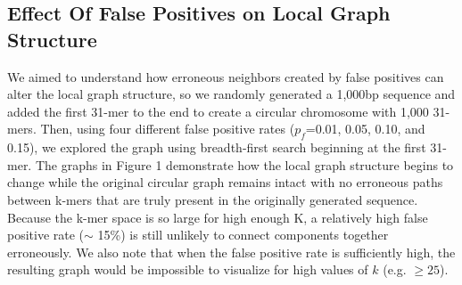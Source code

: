 \documentclass[12pt]{article} \usepackage{simplemargins}
\begin{document}
\subsection{Effect Of False Positives on Local Graph Structure}
We aimed to understand how erroneous neighbors created by false positives can alter 
the local graph structure, so we randomly generated a 1,000bp sequence 
and added the first 31-mer to
the end to create a circular chromosome with 1,000 31-mers. Then,
using four different false positive rates ($p_f$=0.01, 0.05, 0.10, and
0.15), we explored the graph using breadth-first search beginning at
the first 31-mer. 
The graphs in Figure 
1 demonstrate how
the local graph structure begins to change while the original circular
graph remains intact with no erroneous paths between k-mers that are
truly present in the originally generated sequence. Because the k-mer
space is so large for high enough K, a relatively high false positive 
rate ($\sim$ 15\%) is still 
unlikely to connect components
together erroneously. We also note that when the false positive
rate is sufficiently high, the resulting graph would be
impossible to visualize for high values of $k$ (e.g. $\ge 25$). 
\end{document}
